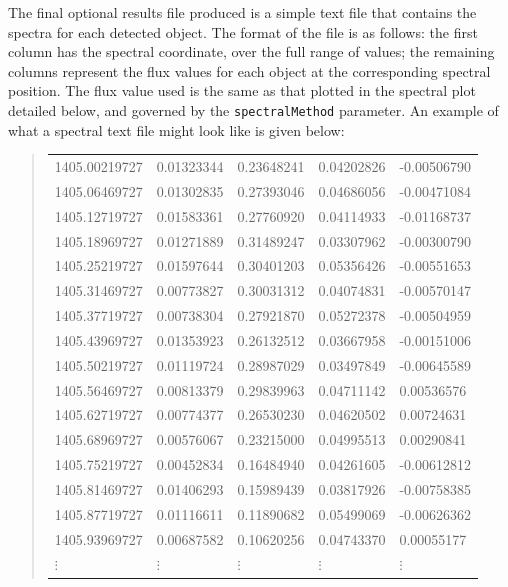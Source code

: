 The final optional results file produced is a simple text file that
contains the spectra for each detected object. The format of the file
is as follows: the first column has the spectral coordinate, over the
full range of values; the remaining columns represent the flux values
for each object at the corresponding spectral position. The flux value
used is the same as that plotted in the spectral plot detailed below,
and governed by the \texttt{spectralMethod} parameter. An example of
what a spectral text file might look like is given below:

\begin{quote}
  {\footnotesize
    \begin{tabular}{lllll}
      1405.00219727  &0.01323344  &0.23648241  &0.04202826  &-0.00506790  \\
      1405.06469727  &0.01302835  &0.27393046  &0.04686056  &-0.00471084  \\
      1405.12719727  &0.01583361  &0.27760920  &0.04114933  &-0.01168737  \\
      1405.18969727  &0.01271889  &0.31489247  &0.03307962  &-0.00300790  \\
      1405.25219727  &0.01597644  &0.30401203  &0.05356426  &-0.00551653  \\
      1405.31469727  &0.00773827  &0.30031312  &0.04074831  &-0.00570147  \\
      1405.37719727  &0.00738304  &0.27921870  &0.05272378  &-0.00504959  \\
      1405.43969727  &0.01353923  &0.26132512  &0.03667958  &-0.00151006  \\  
      1405.50219727  &0.01119724  &0.28987029  &0.03497849  &-0.00645589  \\  
      1405.56469727  &0.00813379  &0.29839963  &0.04711142  &0.00536576   \\  
      1405.62719727  &0.00774377  &0.26530230  &0.04620502  &0.00724631   \\  
      1405.68969727  &0.00576067  &0.23215000  &0.04995513  &0.00290841   \\ 
      1405.75219727  &0.00452834  &0.16484940  &0.04261605  &-0.00612812  \\  
      1405.81469727  &0.01406293  &0.15989439  &0.03817926  &-0.00758385  \\ 
      1405.87719727  &0.01116611  &0.11890682  &0.05499069  &-0.00626362  \\  
      1405.93969727  &0.00687582  &0.10620256  &0.04743370  &0.00055177   \\
      $\vdots$       &$\vdots$    &$\vdots$    &$\vdots$    &$\vdots$     \\
    \end{tabular}
  }
\end{quote}

